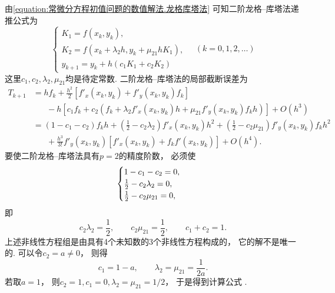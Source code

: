 由\cref{equation:常微分方程初值问题的数值解法.龙格库塔法}
可知二阶龙格--库塔法递推公式为\begin{equation*}
	\begin{cases}
		K_1 = f(x_k,y_k), \\
		K_2 = f(x_k + \lambda_2 h, y_k + \mu_{21} h K_1), \\
		y_{k+1} = y_k + h (c_1 K_1 + c_2 K_2)
	\end{cases}
	\quad(k=0,1,2,\dotsc)
\end{equation*}
这里\(c_1,c_2,\lambda_2,\mu_{21}\)均是待定常数.
二阶龙格--库塔法的局部截断误差为\begin{align*}
	T_{k+1}
	&= h f_k
	+ \frac{h^2}{2}
	[
		f'_x(x_k,y_k)
		+ f'_y(x_k,y_k) f_k
	] \\
	&\hspace{20pt}
	- h [
		c_1 f_k
		+ c_2 (
			f_k
			+ \lambda_2
			f'_x(x_k,y_k) h
			+ \mu_{21} f'_y(x_k,y_k) f_k h
		)
	]
	+ O(h^3) \\
	&= (1 - c_1 - c_2) f_k h
	+ \left( \frac12 - c_2 \lambda_2 \right)
	f'_x(x_k,y_k) h^2
	+ \left( \frac12 - c_2 \mu_{21} \right)
	f'_y(x_k,y_k)
	f_k h^2 \\
	&\hspace{20pt}
	+ \frac{h^3}{3!} f'_y(x_k,y_k)
	[
		f'_x(x_k,y_k)
		+ f_k f'(x_k,y_k)
	]
	+ O(h^4).
\end{align*}
要使二阶龙格--库塔法具有\(p=2\)的精度阶数，
必须使\begin{equation*}
	\def\arraystretch{1.5}
	\begin{cases}
		1 - c_1 - c_2 = 0, \\
		\frac12 - c_2 \lambda_2 = 0, \\
		\frac12 - c_2 \mu_{21} = 0,
	\end{cases}
\end{equation*}
即\begin{equation*}
	c_2 \lambda_2 = \frac12,
	\qquad
	c_2 \mu_{21} = \frac12,
	\qquad
	c_1 + c_2 = 1.
\end{equation*}
上述非线性方程组是由具有4个未知数的3个非线性方程构成的，
它的解不是唯一的.
可以令\(c_2 = a \neq 0\)，
则得\begin{equation*}
	c_1 = 1 - a,
	\qquad
	\lambda_2 = \mu_{21} = \frac{1}{2a}.
\end{equation*}
若取\(a = 1\)，
则\(c_2 = 1, c_1 = 0, \lambda_2 = \mu_{21} = 1/2\)，
于是得到计算公式 .

